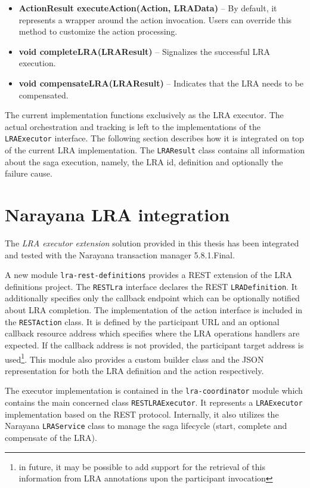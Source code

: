 \documentclass[oneside,
  digital, %
  table,   %
  lof,     %
  lot,     %
]{fithesis3}
\begin{document}
\begin{itemize}
    \item \textbf{ActionResult executeAction(Action, LRAData)} -- By default, it represents a wrapper around the action invocation. Users can override this method to customize the action processing.
    
    \item \textbf{void completeLRA(LRAResult)} -- Signalizes the successful LRA execution.
    
    \item \textbf{void compensateLRA(LRAResult)} -- Indicates that the LRA needs to be compensated.
\end{itemize}

The current implementation functions exclusively as the LRA executor. The actual orchestration and tracking is left to the implementations of the \texttt{LRAExecutor} interface. The following section describes how it is integrated on top of the current LRA implementation. The \texttt{LRAResult} class contains all information about the saga execution, namely, the LRA id, definition and optionally the failure cause.

\section{Narayana LRA integration}
\label{sec:narayana-lra-integration}

The \textit{LRA executor extension} solution provided in this thesis has been integrated and tested with the Narayana transaction manager 5.8.1.Final. 

A new module \texttt{lra-rest-definitions} provides a REST extension of the LRA definitions project. The \texttt{RESTLra} interface declares the REST \texttt{LRADefinition}. It additionally specifies only the callback endpoint which can be optionally notified about LRA completion. The implementation of the action interface is included in the \texttt{RESTAction} class. It is defined by the participant URL and an optional callback resource address which specifies where the LRA operations handlers are expected. If the callback address is not provided, the participant target address is used\footnote{in future, it may be possible to add support for the retrieval of this information from LRA annotations upon the participant invocation}. This module also provides a custom builder class and the JSON representation for both the LRA definition and the action respectively.

The executor implementation is contained in the \texttt{lra-coordinator} module which contains the main concerned class \texttt{RESTLRAExecutor}. It represents a \texttt{LRAExecutor} implementation based on the REST protocol. Internally, it also utilizes the Narayana \texttt{LRAService} class to manage the saga lifecycle (start, complete and compensate of the LRA).
\end{document}
